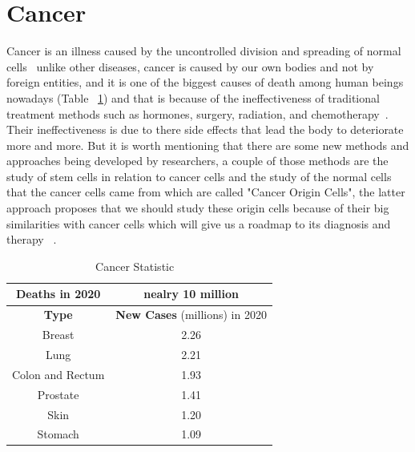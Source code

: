 \section{Cancer}
        Cancer is an illness caused by the uncontrolled division and spreading of normal cells~\cite{whatiscancer2021} unlike other diseases, cancer is caused by our own bodies and not by foreign entities, and it is one of the biggest causes of death among human beings nowadays (Table ~\ref{tab:cancerStat}) and that is because of the ineffectiveness of traditional treatment methods such as hormones, surgery, radiation, and chemotherapy~\cite{mahsa2022}. Their ineffectiveness is due to there side effects that lead the body to deteriorate more and more. But it is worth mentioning that there are some new methods and approaches being developed by researchers, a couple of those methods are the study of stem cells in relation to cancer cells and the study of the normal cells that the cancer cells came from which are called "Cancer Origin Cells", the latter approach proposes that we should study these origin cells because of their big similarities with cancer cells which will give us a roadmap to its diagnosis and therapy~\cite{rachita2021} .
\begin{table}[htbp]
\begin{center}
\begin{tabular}{|c||c|}
Deaths in 2020 & nealry 10 million \\
\hline
\textbf{Type} & \textbf{New Cases} (millions) in 2020 \\
\hline
Breast &  2.26\\
\hline
Lung &  2.21\\
\hline
Colon and Rectum & 1.93 \\
\hline
Prostate & 1.41 \\
\hline
Skin &  1.20 \\
\hline
Stomach & 1.09 \\
\end{tabular}
\end{center}
\caption{Cancer Statistic ~\cite{cancerStat}}
\label{tab:cancerStat}
\end{table}
